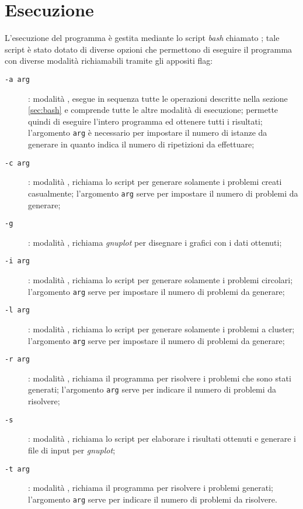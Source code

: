 \section{Esecuzione}
L'esecuzione del programma è gestita mediante lo script \emph{bash} chiamato ; tale script è stato dotato di diverse opzioni che permettono di eseguire il programma con diverse modalità richiamabili tramite gli appositi flag:

\begin{description}
	\item[\texttt{-a arg}]: modalità , esegue in sequenza tutte le operazioni descritte nella sezione \ref{sec:bash} e comprende tutte le altre modalità di esecuzione; permette quindi di eseguire l'intero programma ed ottenere tutti i risultati; l'argomento \texttt{arg} è necessario per impostare il numero di istanze da generare in quanto indica il numero di ripetizioni da effettuare;
	\item[\texttt{-c arg}]: modalità , richiama lo script  per generare solamente i problemi creati casualmente; l'argomento \texttt{arg} serve per impostare il numero di problemi da generare;
	\item[\texttt{-g}]: modalità , richiama \emph{gnuplot} per disegnare i grafici con i dati ottenuti;
	\item[\texttt{-i arg}]: modalità , richiama lo script  per generare  solamente i problemi circolari; l'argomento \texttt{arg} serve per impostare il numero di problemi da generare;
	\item[\texttt{-l arg}]: modalità , richiama lo script  per generare  solamente i problemi a cluster; l'argomento \texttt{arg} serve per impostare il numero di problemi da generare;
	\item[\texttt{-r arg}]: modalità , richiama il programma  per risolvere i problemi che sono stati generati; l'argomento \texttt{arg} serve per indicare il numero di problemi da risolvere;
	\item[\texttt{-s}]: modalità , richiama lo script  per elaborare i risultati ottenuti e generare i file di input per \emph{gnuplot};
	\item[\texttt{-t arg}]: modalità , richiama il programma  per risolvere i problemi generati; l'argomento \texttt{arg} serve per indicare il numero di problemi da risolvere.
\end{description}

